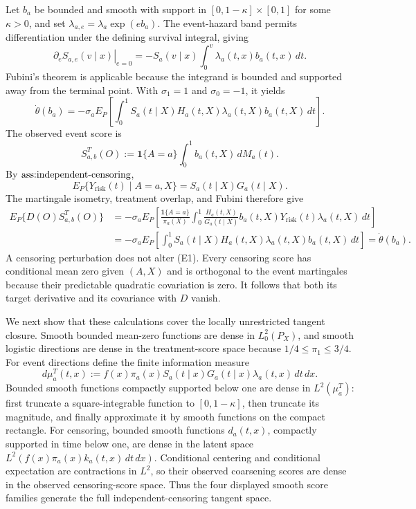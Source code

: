 Let \(b_a\) be bounded and smooth with support in \([0,1-\kappa]\times[0,1]\) for some \(\kappa>0\), and set \(\lambda_{a,e}=\lambda_a\exp(eb_a)\).  The event-hazard band permits differentiation under the defining survival integral, giving
\[
 \left.\partial_eS_{a,e}(v\mid x)\right|_{e=0}
 =-S_a(v\mid x)\int_0^v\lambda_a(t,x)b_a(t,x)\,dt.
\]
Fubini's theorem is applicable because the integrand is bounded and supported away from the terminal point.  With \(\sigma_1=1\) and \(\sigma_0=-1\), it yields
\[
 \dot\theta(b_a)
 =-\sigma_aE_P\!\left[\int_0^1S_a(t\mid X)H_a(t,X)
             \lambda_a(t,X)b_a(t,X)\,dt\right].                       \tag{E4}
\]
The observed event score is
\[
 S^T_{a,b}(O):=\mathbf 1\{A=a\}\int_0^1b_a(t,X)\,dM_a(t).
\]
By \(\textnormal{ass:independent-censoring}\),
\[
 E_P\{Y_{\mathrm{risk}}(t)\mid A=a,X\}=S_a(t\mid X)G_a(t\mid X).
\]
The martingale isometry, treatment overlap, and Fubini therefore give
\[
 \begin{split}
 E_P\{D(O)S^T_{a,b}(O)\}
 &=-\sigma_aE_P\!\left[
   \frac{\mathbf 1\{A=a\}}{\pi_a(X)}
   \int_0^1\frac{H_a(t,X)}{G_a(t\mid X)}b_a(t,X)
       Y_{\mathrm{risk}}(t)\lambda_a(t,X)\,dt\right]\\
 &=-\sigma_aE_P\!\left[\int_0^1S_a(t\mid X)H_a(t,X)
             \lambda_a(t,X)b_a(t,X)\,dt\right]
 =\dot\theta(b_a).                                                     \tag{E5}
 \end{split}
\]
A censoring perturbation does not alter (E1).  Every censoring score has conditional mean zero given \((A,X)\) and is orthogonal to the event martingales because their predictable quadratic covariation is zero.  It follows that both its target derivative and its covariance with \(D\) vanish.

We next show that these calculations cover the locally unrestricted tangent closure.  Smooth bounded mean-zero functions are dense in \(L_0^2(P_X)\), and smooth logistic directions are dense in the treatment-score space because \(1/4\le\pi_1\le3/4\).  For event directions define the finite information measure
\[
 d\mu_a^T(t,x):=f(x)\pi_a(x)S_a(t\mid x)G_a(t\mid x)
                    \lambda_a(t,x)\,dt\,dx.
\]
Bounded smooth functions compactly supported below one are dense in \(L^2(\mu_a^T)\): first truncate a square-integrable function to \([0,1-\kappa]\), then truncate its magnitude, and finally approximate it by smooth functions on the compact rectangle.  For censoring, bounded smooth functions \(d_a(t,x)\), compactly supported in time below one, are dense in the latent space \(L^2(f(x)\pi_a(x)k_a(t,x)\,dt\,dx)\).  Conditional centering and conditional expectation are contractions in \(L^2\), so their observed coarsening scores are dense in the observed censoring-score space.  Thus the four displayed smooth score families generate the full independent-censoring tangent space.

